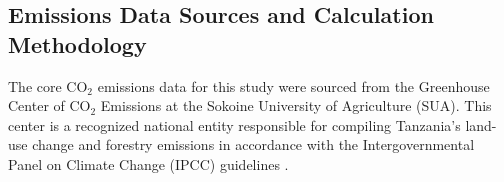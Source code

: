 \documentclass[10pt,letterpaper]{article}
\begin{document}
%
%	
%
\subsection{Emissions Data Sources and Calculation Methodology}

The core CO$_2$ emissions data for this study were sourced from the Greenhouse Center of CO$_2$ Emissions at the Sokoine University of Agriculture (SUA). This center is a recognized national entity responsible for compiling Tanzania’s land-use change and forestry emissions in accordance with the Intergovernmental Panel on Climate Change (IPCC) guidelines \cite{mwakalukwa2024carbon,ahmed2023implications,kohnert2024impact}.
\end{document}
